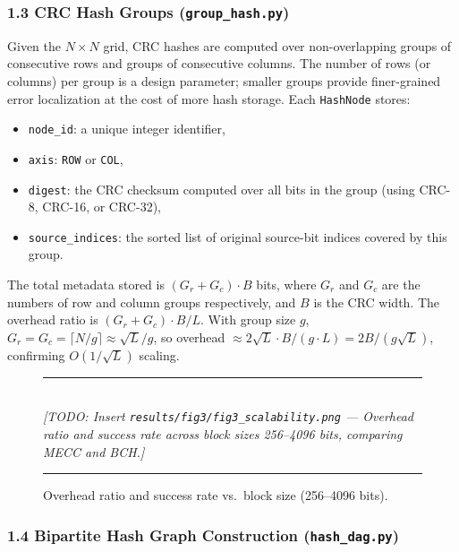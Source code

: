\subsubsection*{1.3 CRC Hash Groups (\texttt{group\_hash.py})}

Given the $N \times N$ grid, CRC hashes are computed over non-overlapping groups of consecutive rows and groups of consecutive columns.
The number of rows (or columns) per group is a design parameter; smaller groups provide finer-grained error localization at the cost of more hash storage.
Each \texttt{HashNode} stores:
\begin{itemize}
    \item \texttt{node\_id}: a unique integer identifier,
    \item \texttt{axis}: \texttt{ROW} or \texttt{COL},
    \item \texttt{digest}: the CRC checksum computed over all bits in the group (using CRC-8, CRC-16, or CRC-32),
    \item \texttt{source\_indices}: the sorted list of original source-bit indices covered by this group.
\end{itemize}

The total metadata stored is $(G_r + G_c) \cdot B$ bits, where $G_r$ and $G_c$ are the numbers of row and column groups respectively, and $B$ is the CRC width.
The overhead ratio is $(G_r + G_c) \cdot B / L$.
With group size $g$, $G_r = G_c = \lceil N/g \rceil \approx \sqrt{L}/g$, so overhead $\approx 2\sqrt{L} \cdot B / (g \cdot L) = 2B/(g\sqrt{L})$, confirming $O(1/\sqrt{L})$ scaling.

\begin{figure}[h]
\centering
\rule{0.85\textwidth}{0.4pt}\\[6pt]
\textit{[TODO: Insert \texttt{results/fig3/fig3\_scalability.png} --- Overhead ratio and success rate across block sizes 256--4096 bits, comparing MECC and BCH.]}\\[6pt]
\rule{0.85\textwidth}{0.4pt}
\caption{Overhead ratio and success rate vs.\ block size (256--4096 bits).}
\label{fig:scalability}
\end{figure}

\subsubsection*{1.4 Bipartite Hash Graph Construction (\texttt{hash\_dag.py})}

